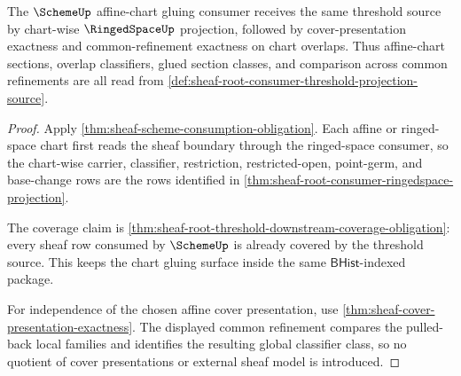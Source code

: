 \begin{theorem}
\label{thm:sheaf-root-consumer-scheme-projection}
The $\SchemeUp$ affine-chart gluing consumer receives the same threshold source by chart-wise $\RingedSpaceUp$ projection, followed by cover-presentation exactness and common-refinement exactness on chart overlaps. Thus affine-chart sections, overlap classifiers, glued section classes, and comparison across common refinements are all read from \autoref{def:sheaf-root-consumer-threshold-projection-source}.
\end{theorem}
\begin{proof}
Apply \autoref{thm:sheaf-scheme-consumption-obligation}. Each affine or ringed-space chart first reads the sheaf boundary through the ringed-space consumer, so the chart-wise carrier, classifier, restriction, restricted-open, point-germ, and base-change rows are the rows identified in \autoref{thm:sheaf-root-consumer-ringedspace-projection}.

The coverage claim is \autoref{thm:sheaf-root-threshold-downstream-coverage-obligation}: every sheaf row consumed by $\SchemeUp$ is already covered by the threshold source. This keeps the chart gluing surface inside the same $\mathsf{BHist}$-indexed package.

For independence of the chosen affine cover presentation, use \autoref{thm:sheaf-cover-presentation-exactness}. The displayed common refinement compares the pulled-back local families and identifies the resulting global classifier class, so no quotient of cover presentations or external sheaf model is introduced.
\end{proof}

